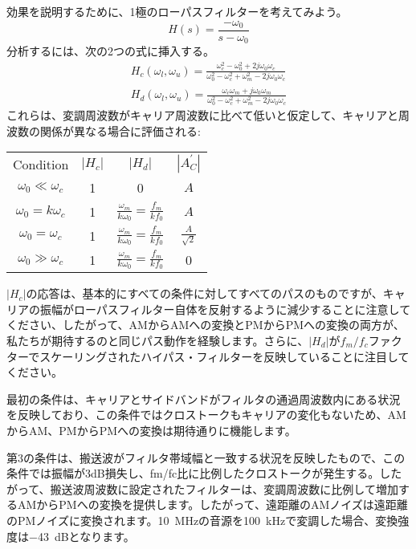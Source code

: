 \documentclass[article]{jlreq}
\begin{document}
効果を説明するために、1極のローパスフィルターを考えてみよう。
%
\begin{equation}
    H(s) = \frac{-\omega_0}{s - \omega_0}
\end{equation}
%
分析するには、次の2つの式に挿入する。
%
\begin{align}
    H_c(\omega_l, \omega_u) = \frac{\omega_c^2-\omega_0^2+2j\omega_0\omega_c}{\omega_0^2-\omega_c^2+\omega_m^2 -2j\omega_0\omega_c} \\
    H_d(\omega_l, \omega_u) = \frac{\omega_c\omega_m+j\omega_0\omega_m}{\omega_0^2-\omega_c^2+\omega_m^2 -2j\omega_0\omega_c}
\end{align}
%
これらは、変調周波数がキャリア周波数に比べて低いと仮定して、キャリアと周波数の関係が異なる場合に評価される:
%
\begin{table}[ht]
    \centering
    \begin{tabular}{cccc}
        Condition               & $|H_c|$ & $|H_d|$                                        & $|A^{\prime}_C|$     \\
        $\omega_0 \ll \omega_c$ & 1       & 0                                              & $A$                  \\
        $\omega_0 = k \omega_c$ & 1       & $\frac{\omega_m}{k\omega_0}=\frac{f_m}{k f_0}$ & $A$                  \\
        $\omega_0=\omega_c$     & 1       & $\frac{\omega_m}{k\omega_0}=\frac{f_m}{k f_0}$ & $\frac{A}{\sqrt{2}}$ \\
        $\omega_0\gg \omega_c$  & 1       & $\frac{\omega_m}{k\omega_0}=\frac{f_m}{k f_0}$ & 0
    \end{tabular}
\end{table}
%
$|H_c|$の応答は、基本的にすべての条件に対してすべてのパスのものですが、キャリアの振幅がローパスフィルター自体を反射するように減少することに注意してください、したがって、AMからAMへの変換とPMからPMへの変換の両方が、私たちが期待するのと同じパス動作を経験します。さらに、$|H_d|$が$f_m/f_c$ファクターでスケーリングされたハイパス・フィルターを反映していることに注目してください。

最初の条件は、キャリアとサイドバンドがフィルタの通過周波数内にある状況を反映しており、この条件ではクロストークもキャリアの変化もないため、AMからAM、PMからPMへの変換は期待通りに機能します。

第3の条件は、搬送波がフィルタ帯域幅と一致する状況を反映したもので、この条件では振幅が3dB損失し、fm/fc比に比例したクロストークが発生する。したがって、搬送波周波数に設定されたフィルターは、変調周波数に比例して増加するAMからPMへの変換を提供します。したがって、遠距離のAMノイズは遠距離のPMノイズに変換されます。\SI{10}{\MHz}の音源を\SI{100}{\kHz}で変調した場合、変換強度は\SI{-43}{\dB}となります。
\end{document}
